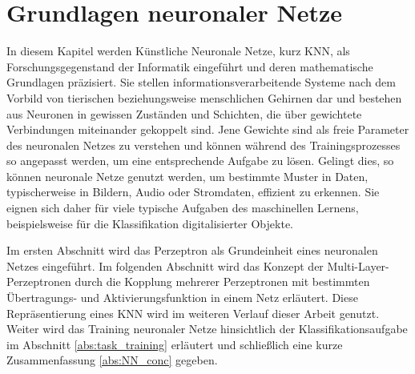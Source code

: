 \chapter{Grundlagen neuronaler Netze}
\label{kapitel_neuralnetworks}

In diesem Kapitel werden Künstliche Neuronale Netze\cite{dayhoff1990neural}, kurz KNN, als Forschungsgegenstand der Informatik eingeführt und deren mathematische Grundlagen präzisiert. 
Sie stellen informationsverarbeitende Systeme nach dem Vorbild von tierischen beziehungsweise menschlichen Gehirnen dar und bestehen aus Neuronen in gewissen Zuständen und Schichten, die über gewichtete Verbindungen miteinander gekoppelt sind. Jene Gewichte sind als freie Parameter des neuronalen Netzes zu verstehen und können während des Trainingsprozesses so angepasst werden, um eine entsprechende Aufgabe zu lösen.  
Gelingt dies, so können neuronale Netze genutzt werden, um bestimmte Muster in Daten, typischerweise in Bildern, Audio oder Stromdaten, effizient zu erkennen\cite{pandya1995pattern, pao1989adaptive, urbaniak2021quality}.
Sie eignen sich daher für viele typische Aufgaben des maschinellen Lernens, beispielsweise für die Klassifikation digitalisierter Objekte.

Im ersten Abschnitt wird das Perzeptron\cite{rosenblatt1958perceptron} als Grundeinheit eines neuronalen Netzes eingeführt. 
Im folgenden Abschnitt wird das Konzept der Multi-Layer-Perzeptronen\cite{werbos1988generalization} durch die Kopplung mehrerer Perzeptronen mit bestimmten Übertragungs- und Aktivierungsfunktion in einem Netz erläutert. Diese Repräsentierung eines KNN wird im weiteren Verlauf dieser Arbeit genutzt. Weiter wird das Training neuronaler Netze hinsichtlich der Klassifikationsaufgabe im Abschnitt \ref{abs:task_training} erläutert und schließlich eine kurze Zusammenfassung \ref{abs:NN_conc} gegeben.

